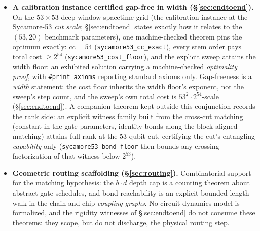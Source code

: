 \documentclass[sigplan,10pt,screen,review,anonymous]{acmart}
\newcommand{\cc}{\mathrm{cc}}
\begin{document}
\begin{itemize}
    \lstinline|ContractionRigid| is equivalent to the nonvanishing of the determinant
    polynomial alone (\S\ref{sec:rigidity}); the packaging carries the
    value: the hypothesis reduces via Kronecker routing to a combinatorial cross-cut
    matching, and the payoff is a formal \emph{no-compression theorem}
    (\lstinline|ContractionRigid.no_compression|): for a rigid parametric family, outside
    the vanishing set of one nonzero polynomial the cut flattening admits
    no factorization with inner dimension below $2^k$, i.e.\ no MPS-style bond and no
    rank-revealing compression (the decision-diagram loophole). We rank this layer below the
    width floor --- its mathematical content is a one-point evaluation argument --- and its
    scope is bounded three ways. The
    measure-zero reading of that vanishing set is stated in prose only
    (\S\ref{sec:limits}); the theorem is \emph{not} composed with the cost floor of
    \S\ref{sec:model} (the two certificates are proved as separate theorems and never
    composed, \S\ref{sec:endtoend}); and the certificate constrains a \emph{given} family $T$:
    its existential instantiation at the benchmark cut is discharged by a Bell-type
    witness available at any balanced cut, carrying no architecture information
    (\S\ref{sec:endtoend}).
  \item \textbf{A calibration instance certified gap-free in width (\S\ref{sec:endtoend}).}
    On the $53\times53$ deep-window spacetime grid (the calibration instance at the Sycamore-53
    \emph{cut scale}; \S\ref{sec:endtoend} states exactly how it relates to the $(53,20)$
    benchmark parameters), one machine-checked theorem pins the optimum exactly:
    $\cc = 54$ (\lstinline|sycamore53_cc_exact|), every stem order pays total cost
    $\ge 2^{54}$ (\lstinline|sycamore53_cost_floor|), and the explicit sweep attains the
    width floor: an exhibited solution carrying a machine-checked \emph{optimality proof},
    with \texttt{\#print axioms} reporting standard axioms only. Gap-freeness is a
    \emph{width} statement: the cost floor inherits the width floor's exponent, not the
    sweep's step count, and the sweep's own total cost is $53^2\cdot 2^{54}$-scale
    (\S\ref{sec:endtoend}). A companion theorem kept outside this conjunction records the
    rank side: an explicit witness family built from the cross-cut matching (constant in
    the gate parameters, identity bonds along the block-aligned matching) attains full rank
    at the $53$-qubit cut, certifying the cut's entangling \emph{capability} only
    (\lstinline|sycamore53_bond_floor| then bounds any crossing factorization of that
    witness below $2^{53}$).
  \item \textbf{Geometric routing scaffolding (\S\ref{sec:routing}).} Combinatorial
    support for the matching hypothesis: the $b\cdot d$ depth cap is a counting theorem
    about abstract gate schedules, and bond reachability is an explicit bounded-length
    walk in the chain and chip \emph{coupling graphs}. No circuit-dynamics model is
    formalized, and the rigidity witnesses of \S\ref{sec:endtoend} do not consume these
    theorems: they scope, but do not discharge, the physical routing step.
\end{itemize}
\end{document}
